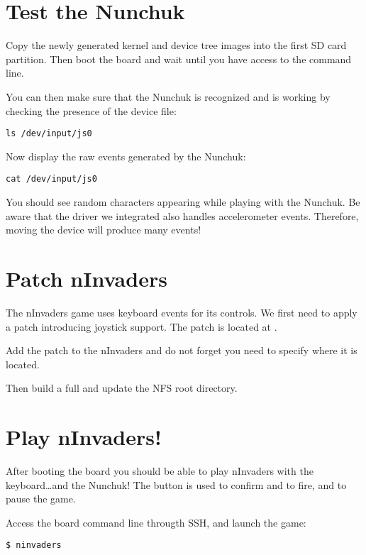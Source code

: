 \section{Test the Nunchuk}

Copy the newly generated kernel and device tree images into the first SD card
partition. Then boot the board and wait until you have access to the
 command line.

You can then make sure that the Nunchuk is recognized and is working by
checking the presence of the  device file:
\begin{verbatim}
ls /dev/input/js0
\end{verbatim}

Now display the raw events generated by the Nunchuk:
\begin{verbatim}
cat /dev/input/js0
\end{verbatim}

You should see random characters appearing while playing with the Nunchuk. Be
aware that the driver we integrated also handles accelerometer events. Therefore,
moving the device will produce many events!

\section{Patch nInvaders}

The nInvaders game uses keyboard events for its controls. We first need to apply
a patch introducing joystick support. The patch is located at
.

Add the patch to the nInvaders  and do not forget you need to
specify where it is located.

Then build a full  and update the NFS root
directory.

\section{Play nInvaders!}

After booting the board you should be able to play nInvaders with the
keyboard\dots and the Nunchuk! The  button is used to confirm and to
fire, and  to pause the game.

Access the board command line througth SSH, and launch the game:
\begin{verbatim}
$ ninvaders
\end{verbatim}
